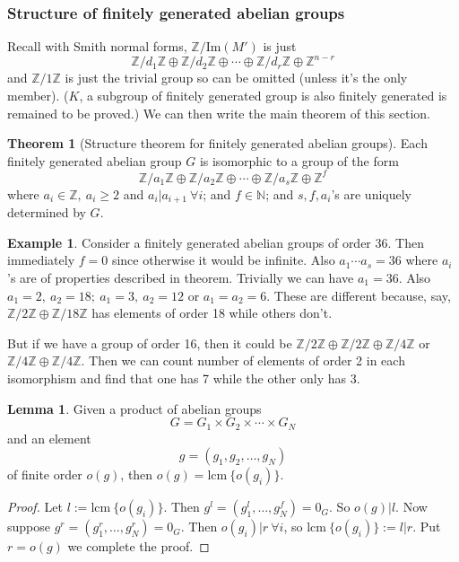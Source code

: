 \documentclass[a4paper]{article}
\newcommand{\lcm}{\text{lcm}\ }
\theoremstyle{definition}
\newtheorem{thm}[defn]{Theorem}
\newtheorem{lemma}[defn]{Lemma}
\newtheorem{example}[defn]{Example}
\begin{document}
\subsubsection{Structure of finitely generated abelian groups}
Recall with Smith normal forms, $\mathbb Z/\text{Im}(M')$ is just
\[
\mathbb Z/d_1 \mathbb Z \oplus \mathbb Z/d_2 \mathbb Z \oplus \cdots \oplus \mathbb Z/d_r \mathbb Z \oplus \mathbb Z^{n-r}
\]
and $\mathbb Z/1\mathbb Z$ is just the trivial group so can be omitted (unless it's the only member). ($K$, a subgroup of finitely generated group is also finitely generated is remained to be proved.) We can then write the main theorem of this section.
\begin{thm}[Structure theorem for finitely generated abelian groups]
Each finitely generated abelian group $G$ is isomorphic to a group of the form
\[
\mathbb Z/a_1 \mathbb Z \oplus \mathbb Z/a_2 \mathbb Z \oplus \cdots \oplus \mathbb Z/a_s \mathbb Z \oplus \mathbb Z^f
\]
where $a_i \in \mathbb Z,\ a_i \geq 2$ and $a_i|a_{i+1} \ \forall i$; and $f\in \mathbb N$; and $s,f,a_i$'s are uniquely determined by $G$.
\end{thm}
\begin{example}
Consider a finitely generated abelian groups of order 36. Then immediately $f=0$ since otherwise it would be infinite. Also $a_1\cdots a_s=36$ where $a_i$'s are of properties described in theorem. Trivially we can have $a_1=36$. Also $a_1=2,\ a_2=18;\ a_1=3,\ a_2=12$ or $a_1=a_2=6$. These are different because, say, $\mathbb Z/2\mathbb Z \oplus \mathbb Z/18\mathbb Z$ has elements of order 18 while others don't.

But if we have a group of order 16, then it could be $\mathbb Z/2\mathbb Z \oplus \mathbb Z/2\mathbb Z \oplus \mathbb Z/4\mathbb Z$ or $\mathbb Z/4\mathbb Z\oplus \mathbb Z/4\mathbb Z$. Then we can count number of elements of order 2 in each isomorphism and find that one has 7 while the other only has 3.
\end{example}
\begin{lemma}
Given a product of abelian groups
\[
G=G_1 \times G_2 \times \cdots \times G_N
\]
and an element
\[
g=(g_1,g_2,\ldots,g_N)
\]
of finite order $o(g)$, then $o(g)=\lcm \{o(g_i)\}$.
\end{lemma}
\begin{proof}
Let $l:=\lcm \{o(g_i)\}$. Then $g^l = \left(g_1^l,\ldots,g_N^f \right)=0_G$. So $o(g)|l$. Now suppose $g^r = \left(g_1^r,\ldots,g_N^r \right)=0_G$. Then $o(g_i)|r \ \forall i$, so $\lcm \{o(g_i)\} :=l |r$. Put $r=o(g)$ we complete the proof.
\end{proof}
\end{document}
